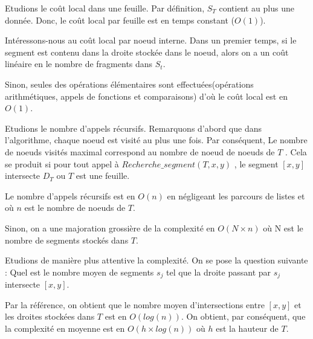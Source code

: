 Etudions le coût local dans une feuille. Par définition, $S_T$ contient au plus une donnée.
Donc, le coût local par feuille est en temps constant ($O(1)$).

Intéressons-nous au coût local par noeud interne.
Dans un premier temps, si le segment est contenu dans la droite stockée dans le noeud,
alors on a un coût linéaire en le nombre de fragments dans $S_t$.

Sinon, seules des opérations élémentaires sont effectuées(opérations arithmétiques,
appels de fonctions et comparaisons) d'où le coût local est en $O(1)$.

Etudions le nombre d'appels récursifs. Remarquons d'abord que dans l'algorithme,
chaque noeud est visité au plus une fois.
Par conséquent, Le nombre de noeuds visités maximal correspond au nombre de noeud de noeuds de $T$
. Cela se produit si pour tout appel à $Recherche\_segment(T,x,y)$ , le segment $[x,y]$ intersecte
$D_T$ ou $T$ est une feuille.

Le nombre d'appels récursifs est en $O(n)$ en négligeant les parcours de listes
et où $n$ est le nombre de noeuds de $T$.

Sinon, on a une majoration grossière de la complexité en $O(N \times n)$
où N est le nombre de segments stockés dans $T$.

Etudions de manière plus attentive la complexité. On se pose la question suivante :
Quel est le nombre moyen de segments $s_j$ tel que la droite passant par $s_j$ intersecte $[x,y]$.

Par la référence, on obtient que le nombre moyen d'intersections entre $[x,y]$ et les droites
stockées dans $T$ est en $O(log (n))$. On obtient, par conséquent, que la complexité en moyenne
est en $O(h \times log (n))$ où $h$ est la hauteur de $T$. 